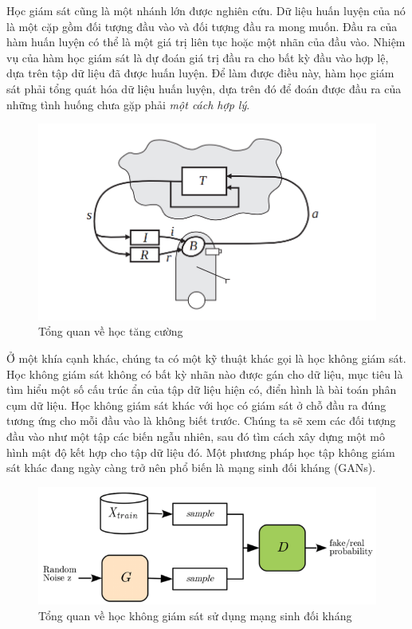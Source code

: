 Học giám sát cũng là một nhánh lớn được nghiên cứu. Dữ liệu huấn luyện của nó là một cặp gồm đối tượng đầu vào và đối tượng đầu ra mong muốn. Đầu ra của hàm huấn luyện có thể là một giá trị liên tục hoặc một nhãn của đầu vào. Nhiệm vụ của hàm học giám sát là dự đoán giá trị đầu ra cho bất kỳ đầu vào hợp lệ, dựa trên tập dữ liệu đã được huấn luyện. Để làm được điều này, hàm học giám sát phải tổng quát hóa dữ liệu huấn luyện, dựa trên đó để đoán được đầu ra của những tình huống chưa gặp phải \textit{một cách hợp lý}.


\begin{figure}
    \centering
    \includegraphics[scale=0.5]{graphics/chapter-2/chap2-rl-overview.png}
    \caption{Tổng quan về học tăng cường}
    \label{fig:chap2-rl-overview}
\end{figure}


Ở một khía cạnh khác, chúng ta có một kỹ thuật khác gọi là học không giám sát. Học không giám sát không có bất kỳ nhãn nào được gán cho dữ liệu, mục tiêu là tìm hiểu một số cấu trúc ẩn của tập dữ liệu hiện có, điển hình là bài toán phân cụm dữ liệu. Học không giám sát khác với học có giám sát ở chỗ đầu ra đúng tương ứng cho mỗi đầu vào là không biết trước. Chúng ta sẽ xem các đối tượng đầu vào như một tập các biến ngẫu nhiên, sau đó tìm cách xây dựng một mô hình mật độ kết hợp cho tập dữ liệu đó. Một phương pháp học tập không giám sát khác đang ngày càng trở nên phổ biến là mạng sinh đối kháng (GANs).

\begin{figure}
    \centering
    \includegraphics[scale=0.6]{graphics/chapter-2/chap2-gan-overview.png}
    \caption{Tổng quan về học không giám sát sử dụng mạng sinh đối kháng}
    \label{fig:chap2-gan-overview}
\end{figure}


